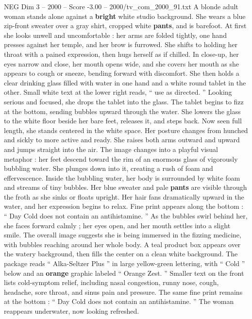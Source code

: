 \begin{textsample}{NEG Dim 3 – 2000 – Score -3.00 – 2000/tv\_com\_2000\_91.txt}  \label{ex:f3_neg_037}
A blonde adult woman stands alone against a \textbf{bright} white studio background.
She wears a blue zip-front sweater over a gray shirt, cropped white \textbf{pants}, and is barefoot.
At first she looks unwell and uncomfortable : her arms are folded tightly, one hand presses against her temple, and her brow is furrowed.
She shifts to holding her throat with a pained expression, then hugs herself as if chilled.
In close-up, her eyes narrow and close, her mouth opens wide, and she covers her mouth as she appears to cough or sneeze, bending forward with discomfort.
She then holds a clear drinking glass filled with water in one hand and a white round tablet in the other.
Small white text at the lower right reads, “ use as directed. ” Looking serious and focused, she drops the tablet into the glass.
The tablet begins to fizz at the bottom, sending bubbles upward through the water.
She lowers the glass to the white floor beside her bare feet, releases it, and steps back.
Now seen full length, she stands centered in the white space.
Her posture changes from hunched and sickly to more active and ready.
She raises both arms outward and upward and jumps straight into the air.
The image changes into a playful visual metaphor : her feet descend toward the rim of an enormous glass of vigorously bubbling water.
She plunges down into it, creating a rush of foam and effervescence.
Inside the bubbling water, her body is surrounded by white foam and streams of tiny bubbles.
Her blue sweater and pale \textbf{pants} are visible through the froth as she sinks or floats upright.
Her hair fans dramatically upward in the water, and her expression begins to relax.
Fine print appears along the bottom : “ Day Cold does not contain an antihistamine. ” As the bubbles swirl behind her, she faces forward calmly ; her eyes open, and her mouth settles into a slight smile.
The overall image suggests she is being immersed in the fizzing medicine, with bubbles reaching around her whole body.
A teal product box appears over the watery background, then fills the center on a clean white background.
The package reads “ Alka-Seltzer Plus ” in large yellow-green lettering, with “ Cold ” below and an \textbf{orange} graphic labeled “ Orange Zest. ” Smaller text on the front lists cold-symptom relief, including nasal congestion, runny nose, cough, headache, sore throat, and sinus pain and pressure.
The same fine print remains at the bottom : “ Day Cold does not contain an antihistamine. ” The woman reappears underwater, now looking refreshed.

\end{textsample}
